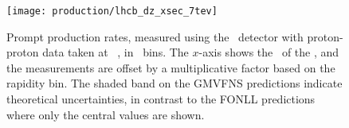 \begin{figure}
  \centering
  \texttt{[image: production/lhcb\_dz\_xsec\_7tev]}
  \caption{%
    Prompt \PDzero production rates, measured using the \lhcb\ detector with 
    proton-proton data taken at ~\cite{LHCb-PAPER-2012-041}, in 
    \pTy\ bins.
    The $x$-axis shows the \pT\ of the \PDzero, and the measurements are offset 
    by a multiplicative factor based on the rapidity bin.
    The shaded band on the \ac{GMVFNS} predictions indicate theoretical 
    uncertainties, in contrast to the FONLL predictions where only the central 
    values are shown.
  }
  \label{fig:prod:theory:comparisons:7tev}
\end{figure}
